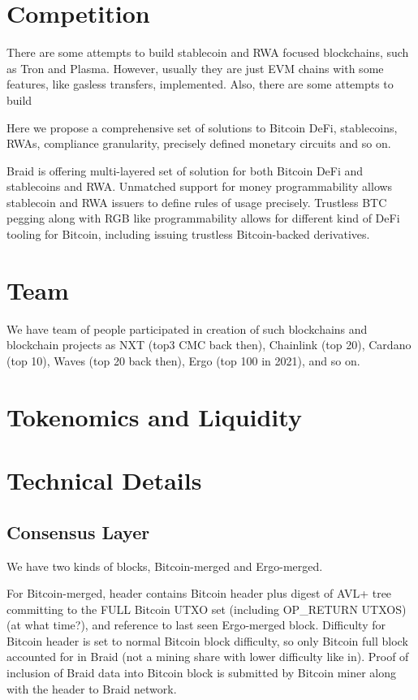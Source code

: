 \documentclass{llncs}   %
\newcommand{\authnote}[2]{\marginpar{\parbox{\marginparwidth}{\tiny %
  \textsf{#1 {\textcolor{blue}{notes: #2}}}}}%
  \textcolor{blue}{\textbf{\dag}}}
\newcommand{\authnote}[2]{
  \textsf{#1 \textcolor{blue}{: #2}}}
\newcommand{\authnote}[2]{}
\newcommand{\knote}[1]{{\authnote{\textcolor{green}{kushti notes}}{#1}}}
\newcommand{\bc}{Braid}
\begin{document}
\section{Competition}
\label{sec-competition}


There are some attempts to build stablecoin and RWA focused blockchains, such as Tron and Plasma. However, usually they are just EVM chains with some features, like gasless transfers, implemented. Also, there are some attempts to build 

Here we propose a comprehensive set of solutions to Bitcoin DeFi, stablecoins, RWAs,
compliance granularity, precisely defined monetary circuits and so on.  

\bc{} is offering multi-layered set of solution for both Bitcoin DeFi and stablecoins and RWA. Unmatched support for money programmability allows stablecoin and RWA issuers to define rules of usage precisely. Trustless BTC pegging along with RGB like programmability allows for different kind of DeFi tooling for Bitcoin, including issuing trustless Bitcoin-backed derivatives. 


\section{Team}
\label{sec-team}

We have team of people participated in creation of such blockchains and blockchain projects as NXT (top3 CMC back then), Chainlink (top 20),
 Cardano (top 10), Waves (top 20 back then), Ergo (top 100 in 2021), and so on.


\section{Tokenomics and Liquidity}
\label{sec-tokenomics}

\knote{to be decided later}



\section{Technical Details}
\label{sec-techdetails}

\subsection{Consensus Layer}

We have two kinds of blocks, Bitcoin-merged and Ergo-merged.

For Bitcoin-merged, header contains Bitcoin header plus digest of AVL+ tree committing to the FULL Bitcoin UTXO set (including OP\_RETURN UTXOS) (at what time?), and reference to last seen Ergo-merged block. Difficulty for Bitcoin header is set to normal Bitcoin block difficulty, so only Bitcoin full block accounted for in Braid (not a mining share with lower difficulty like in). Proof of inclusion of Braid data into Bitcoin block is submitted by Bitcoin miner along with the header to Braid network.
\end{document}
